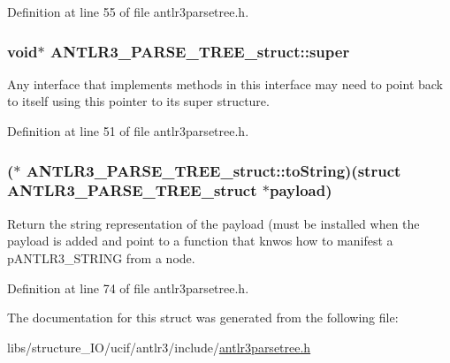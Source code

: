 Definition at line 55 of file antlr3parsetree.\-h.

\hypertarget{struct_a_n_t_l_r3___p_a_r_s_e___t_r_e_e__struct_a1170ffff19fe53a48dc3cad2b56babeb}{
\subsubsection[{super}]{\setlength{\rightskip}{0pt plus 5cm}void$\ast$ A\-N\-T\-L\-R3\-\_\-\-P\-A\-R\-S\-E\-\_\-\-T\-R\-E\-E\-\_\-struct\-::super}}\label{struct_a_n_t_l_r3___p_a_r_s_e___t_r_e_e__struct_a1170ffff19fe53a48dc3cad2b56babeb}
Any interface that implements methods in this interface may need to point back to itself using this pointer to its super structure. 

Definition at line 51 of file antlr3parsetree.\-h.

\hypertarget{struct_a_n_t_l_r3___p_a_r_s_e___t_r_e_e__struct_a58505143179c17cd36041a6d2688e1ec}{
\subsubsection[{to\-String}]{($\ast$ A\-N\-T\-L\-R3\-\_\-\-P\-A\-R\-S\-E\-\_\-\-T\-R\-E\-E\-\_\-struct\-::to\-String)(struct {\bf A\-N\-T\-L\-R3\-\_\-\-P\-A\-R\-S\-E\-\_\-\-T\-R\-E\-E\-\_\-struct} $\ast${\bf payload})}}\label{struct_a_n_t_l_r3___p_a_r_s_e___t_r_e_e__struct_a58505143179c17cd36041a6d2688e1ec}
Return the string representation of the payload (must be installed when the payload is added and point to a function that knwos how to manifest a p\-A\-N\-T\-L\-R3\-\_\-\-S\-T\-R\-I\-N\-G from a node. 

Definition at line 74 of file antlr3parsetree.\-h.



The documentation for this struct was generated from the following file\-:\begin{DoxyCompactItemize}
\item 
libs/structure\-\_\-\-I\-O/ucif/antlr3/include/\hyperlink{antlr3parsetree_8h}{antlr3parsetree.\-h}\end{DoxyCompactItemize}
